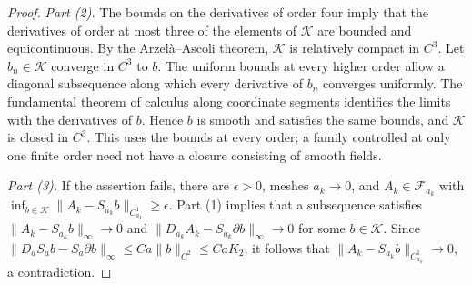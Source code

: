 \begin{proof}
\emph{Part (2).} The bounds on the derivatives of order four imply that the derivatives of order at most three of the elements of $\mathscr K$ are bounded and equicontinuous. By the Arzel\`a--Ascoli theorem, $\mathscr K$ is relatively compact in $C^3$. Let $b_n\in\mathscr K$ converge in $C^3$ to $b$. The uniform bounds at every higher order allow a diagonal subsequence along which every derivative of $b_n$ converges uniformly. The fundamental theorem of calculus along coordinate segments identifies the limits with the derivatives of $b$. Hence $b$ is smooth and satisfies the same bounds, and $\mathscr K$ is closed in $C^3$. This uses the bounds at every order; a family controlled at only one finite order need not have a closure consisting of smooth fields.

\emph{Part (3).} If the assertion fails, there are $\epsilon>0$, meshes $a_k\to0$, and $A_k\in\mathcal F_{a_k}$ with $\inf_{b\in\mathscr K}\|A_k-S_{a_k}b\|_{C^1_{a_k}}\ge\epsilon$. Part (1) implies that a subsequence satisfies $\|A_k-S_{a_k}b\|_\infty\to0$ and $\|D_{a_k}A_k-S_{a_k}\partial b\|_\infty\to0$ for some $b\in\mathscr K$. Since $\|D_aS_ab-S_a\partial b\|_\infty\le Ca\|b\|_{C^2}\le CaK_2$, it follows that $\|A_k-S_{a_k}b\|_{C^1_{a_k}}\to0$, a contradiction.
\end{proof}

